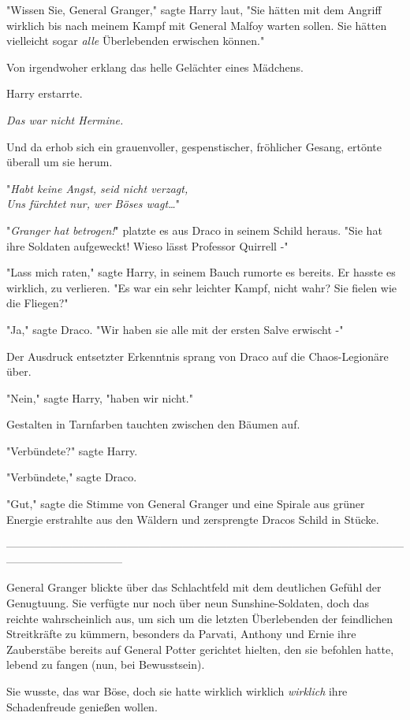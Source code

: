 {"Wissen Sie, General Granger," sagte Harry laut, "Sie hätten mit dem Angriff wirklich bis nach meinem Kampf mit General Malfoy warten sollen. Sie hätten vielleicht sogar \emph{alle} Überlebenden erwischen können."

Von irgendwoher erklang das helle Gelächter eines Mädchens.

Harry erstarrte.

\emph{Das war nicht Hermine.}

Und da erhob sich ein grauenvoller, gespenstischer, fröhlicher Gesang, ertönte überall um sie herum.

"\emph{Habt keine Angst, seid nicht verzagt,\\ Uns fürchtet nur, wer Böses wagt…}"

"\emph{Granger hat betrogen!}" platzte es aus Draco in seinem Schild heraus. "Sie hat ihre Soldaten aufgeweckt! Wieso lässt Professor Quirrell -"

"Lass mich raten," sagte Harry, in seinem Bauch rumorte es bereits. Er hasste es wirklich, zu verlieren. "Es war ein sehr leichter Kampf, nicht wahr? Sie fielen wie die Fliegen?"

"Ja," sagte Draco. "Wir haben sie alle mit der ersten Salve erwischt -"

Der Ausdruck entsetzter Erkenntnis sprang von Draco auf die Chaos-Legionäre über.

"Nein," sagte Harry, "haben wir nicht."

Gestalten in Tarnfarben tauchten zwischen den Bäumen auf.

"Verbündete?" sagte Harry.

"Verbündete," sagte Draco.

"Gut," sagte die Stimme von General Granger und eine Spirale aus grüner Energie erstrahlte aus den Wäldern und zersprengte Dracos Schild in Stücke.

--------------------------------------------------------------------------------------------------------------------------------------------

General Granger blickte über das Schlachtfeld mit dem deutlichen Gefühl der Genugtuung. Sie verfügte nur noch über neun Sunshine-Soldaten, doch das reichte wahrscheinlich aus, um sich um die letzten Überlebenden der feindlichen Streitkräfte zu kümmern, besonders da Parvati, Anthony und Ernie ihre Zauberstäbe bereits auf General Potter gerichtet hielten, den sie befohlen hatte, lebend zu fangen (nun, bei Bewusstsein).

Sie wusste, das war Böse, doch sie hatte wirklich wirklich \emph{wirklich} ihre Schadenfreude genießen wollen.

}
